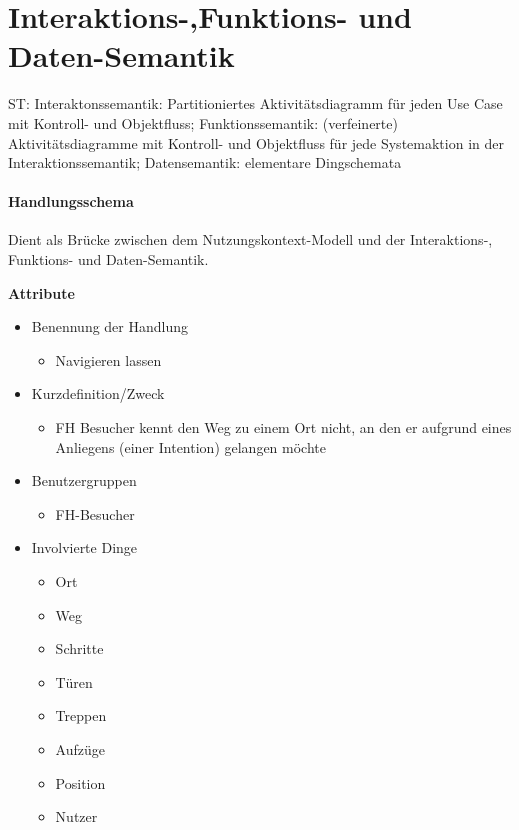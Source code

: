 \chapter{Interaktions-,Funktions- und Daten-Semantik}
ST: Interaktonssemantik: Partitioniertes Aktivitätsdiagramm für jeden Use
Case mit Kontroll- und Objektfluss;
Funktionssemantik: (verfeinerte) Aktivitätsdiagramme mit Kontroll- und
Objektfluss für jede Systemaktion in der Interaktionssemantik;
Datensemantik: elementare Dingschemata

\subsubsection*{Handlungsschema}
Dient als Brücke zwischen dem Nutzungskontext-Modell und der Interaktions-, Funktions- und Daten-Semantik.

\textbf{Attribute}
\begin{itemize}
\item Benennung der Handlung
    \begin{itemize}
    \item Navigieren lassen
    \end{itemize}
\item Kurzdefinition/Zweck
    \begin{itemize}
    \item FH Besucher kennt den Weg zu einem Ort    nicht, an den er aufgrund eines Anliegens (einer Intention) gelangen möchte
    \end{itemize}
\item Benutzergruppen
    \begin{itemize}
    \item FH-Besucher
    \end{itemize}
\item Involvierte Dinge
    \begin{itemize}
    \item Ort
    \item Weg
    \item Schritte
    \item Türen
    \item Treppen
    \item Aufzüge
    \item Position
    \item Nutzer
    \end{itemize}
\end{itemize}

